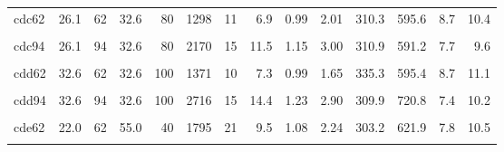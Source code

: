 \begin{landscape}
\begin{longtable}[t]{lrrrrrrrrrrrrr}
cdc62 & 26.1 & 62 & 32.6 & 80 & 1298 & 11 & 6.9 & 0.99 & 2.01 & 310.3 & 595.6 & 8.7 & 10.4\\
\cellcolor{gray!6}{cdc78} & \cellcolor{gray!6}{26.1} & \cellcolor{gray!6}{78} & \cellcolor{gray!6}{32.6} & \cellcolor{gray!6}{80} & \cellcolor{gray!6}{1808} & \cellcolor{gray!6}{11} & \cellcolor{gray!6}{9.6} & \cellcolor{gray!6}{0.92} & \cellcolor{gray!6}{2.87} & \cellcolor{gray!6}{316.3} & \cellcolor{gray!6}{591.8} & \cellcolor{gray!6}{8.3} & \cellcolor{gray!6}{9.6}\\
cdc94 & 26.1 & 94 & 32.6 & 80 & 2170 & 15 & 11.5 & 1.15 & 3.00 & 310.9 & 591.2 & 7.7 & 9.6\\
\cellcolor{gray!6}{cdd46} & \cellcolor{gray!6}{32.6} & \cellcolor{gray!6}{46} & \cellcolor{gray!6}{32.6} & \cellcolor{gray!6}{100} & \cellcolor{gray!6}{1070} & \cellcolor{gray!6}{27} & \cellcolor{gray!6}{5.7} & \cellcolor{gray!6}{1.00} & \cellcolor{gray!6}{1.76} & \cellcolor{gray!6}{319.4} & \cellcolor{gray!6}{321.4} & \cellcolor{gray!6}{9.1} & \cellcolor{gray!6}{12.0}\\
cdd62 & 32.6 & 62 & 32.6 & 100 & 1371 & 10 & 7.3 & 0.99 & 1.65 & 335.3 & 595.4 & 8.7 & 11.1\\
\cellcolor{gray!6}{cdd78} & \cellcolor{gray!6}{32.6} & \cellcolor{gray!6}{78} & \cellcolor{gray!6}{32.6} & \cellcolor{gray!6}{100} & \cellcolor{gray!6}{1897} & \cellcolor{gray!6}{10} & \cellcolor{gray!6}{10.0} & \cellcolor{gray!6}{1.00} & \cellcolor{gray!6}{1.94} & \cellcolor{gray!6}{314.0} & \cellcolor{gray!6}{620.2} & \cellcolor{gray!6}{8.7} & \cellcolor{gray!6}{14.1}\\
cdd94 & 32.6 & 94 & 32.6 & 100 & 2716 & 15 & 14.4 & 1.23 & 2.90 & 309.9 & 720.8 & 7.4 & 10.2\\
\cellcolor{gray!6}{cde46} & \cellcolor{gray!6}{22.0} & \cellcolor{gray!6}{46} & \cellcolor{gray!6}{55.0} & \cellcolor{gray!6}{40} & \cellcolor{gray!6}{1626} & \cellcolor{gray!6}{30} & \cellcolor{gray!6}{8.6} & \cellcolor{gray!6}{1.11} & \cellcolor{gray!6}{3.06} & \cellcolor{gray!6}{376.2} & \cellcolor{gray!6}{691.9} & \cellcolor{gray!6}{7.7} & \cellcolor{gray!6}{10.7}\\
cde62 & 22.0 & 62 & 55.0 & 40 & 1795 & 21 & 9.5 & 1.08 & 2.24 & 303.2 & 621.9 & 7.8 & 10.5\\
\cellcolor{gray!6}{cde78} & \cellcolor{gray!6}{22.0} & \cellcolor{gray!6}{78} & \cellcolor{gray!6}{55.0} & \cellcolor{gray!6}{40} & \cellcolor{gray!6}{1868} & \cellcolor{gray!6}{13} & \cellcolor{gray!6}{9.9} & \cellcolor{gray!6}{1.36} & \cellcolor{gray!6}{2.52} & \cellcolor{gray!6}{374.0} & \cellcolor{gray!6}{630.5} & \cellcolor{gray!6}{6.8} & \cellcolor{gray!6}{10.0}\\

\end{longtable}
\end{landscape}
